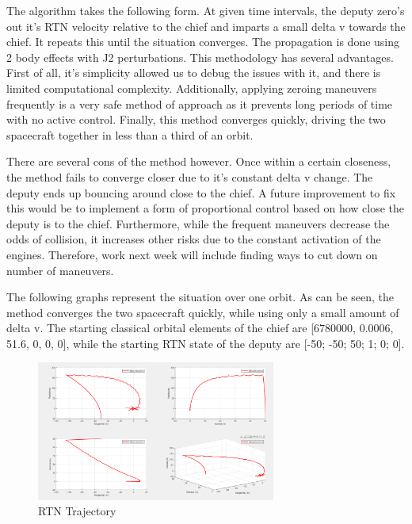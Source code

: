 The algorithm takes the following form. At given time intervals, the deputy zero's out it's RTN velocity relative to the chief and imparts a small delta v towards the chief. It repeats this until the situation converges. The propagation is done using 2 body effects with J2 perturbations. This methodology has several advantages. First of all, it's simplicity allowed us to debug the issues with it, and there is limited computational complexity. Additionally, applying zeroing maneuvers frequently is a very safe method of approach as it prevents long periods of time with no active control. Finally, this method converges quickly, driving the two spacecraft together in less than a third of an orbit.

There are several cons of the method however. Once within a certain closeness, the method fails to converge closer due to it's constant delta v change. The deputy ends up bouncing around close to the chief. A future improvement to fix this would be to implement a form of proportional control based on how close the deputy is to the chief. Furthermore, while the frequent maneuvers decrease the odds of collision, it increases other risks due to the constant activation of the engines. Therefore, work next week will include finding ways to cut down on number of maneuvers. 

The following graphs represent the situation over one orbit. As can be seen, the method converges the two spacecraft quickly, while using only a small amount of delta v. The starting classical orbital elements of the chief are [6780000, 0.0006, 51.6, 0, 0, 0], while the starting RTN state of the deputy are [-50; -50; 50; 1; 0; 0].

\begin{figure}[H]
    \centering
    \includegraphics[width=0.7\textwidth]{PS5/Figures/position.png}
    \caption{RTN Trajectory}
    \label{fig:hcw_velocity}
\end{figure}

